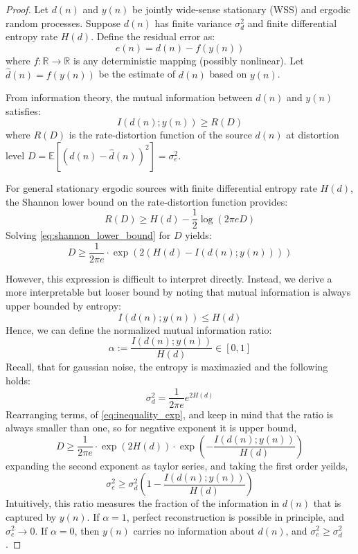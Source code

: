 \documentclass{article}
\begin{document}
\begin{proof}
Let \( d(n) \) and \( y(n) \) be jointly wide-sense stationary (WSS) and ergodic random processes. Suppose \( d(n) \) has finite variance \( \sigma_d^2 \) and finite differential entropy rate \( H(d) \). Define the residual error as:
\[
e(n) = d(n) - f(y(n))
\]
where \( f: \mathbb{R} \to \mathbb{R} \) is any deterministic mapping (possibly nonlinear). Let \( \hat{d}(n) = f(y(n)) \) be the estimate of \( d(n) \) based on \( y(n) \).

From information theory, the mutual information between \( d(n) \) and \( y(n) \) satisfies:
\begin{equation}
I(d(n); y(n)) \geq R(D)
\label{eq:rate_distortion_lower_bound}
\end{equation}
where \( R(D) \) is the rate-distortion function of the source \( d(n) \) at distortion level \( D = \mathbb{E}[(d(n) - \hat{d}(n))^2] = \sigma_e^2 \).

For general stationary ergodic sources with finite differential entropy rate \( H(d) \), the Shannon lower bound on the rate-distortion function provides:
\begin{equation}
R(D) \geq H(d) - \frac{1}{2} \log(2\pi e D)
\label{eq:shannon_lower_bound}
\end{equation}
Solving \eqref{eq:shannon_lower_bound} for \( D \) yields:
\begin{equation}
    D \geq \frac{1}{2\pi e} \cdot \exp\left(2(H(d) - I(d(n); y(n)))\right)
    \label{eq:inequality_exp}
\end{equation}

However, this expression is difficult to interpret directly. Instead, we derive a more interpretable but looser bound by noting that mutual information is always upper bounded by entropy:
\[
I(d(n); y(n)) \leq H(d)
\]
Hence, we can define the normalized mutual information ratio:
\[
\alpha := \frac{I(d(n); y(n))}{H(d)} \in [0, 1]
\]
Recall, that for gaussian noise, the entropy is maximazied and the following holds:
\[
\sigma^2_d  = \frac{1}{2\pi e}e^{2H(d)} \]
Rearranging terms, of \eqref{eq:inequality_exp}, and keep in mind that the ratio is always smaller than one, so for negative exponent it is upper bound,
\[
D \geq \frac{1}{2\pi e} \cdot \exp\left(2H(d)\right) \cdot \exp\left(- \frac{I(d(n); y(n))}{H(d)}\right)
\]
expanding the second exponent as taylor series, and taking the first order yeilds,
\begin{equation}
\sigma_e^2 \geq \sigma_d^2 \left(1 - \frac{I(d(n); y(n))}{H(d)} \right)
\end{equation}
Intuitively, this ratio measures the fraction of the information in \( d(n) \) that is captured by \( y(n) \). If \( \alpha = 1 \), perfect reconstruction is possible in principle, and \( \sigma_e^2 \to 0 \). If \( \alpha = 0 \), then \( y(n) \) carries no information about \( d(n) \), and \( \sigma_e^2 \geq \sigma_d^2 \).


\end{proof}
\end{document}

